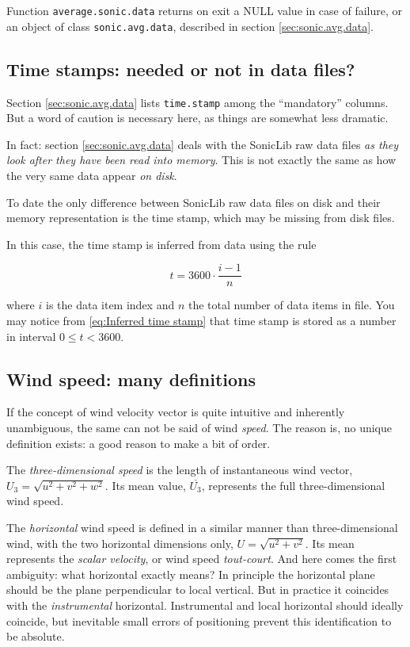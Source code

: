 \documentclass[a4paper,10pt]{book}
\begin{document}
Function \verb|average.sonic.data| returns on exit a NULL value in case of failure, or an object of class \verb|sonic.avg.data|, described in section \ref{sec:sonic.avg.data}.

\subsection{Time stamps: needed or not in data files?}

Section \ref{sec:sonic.avg.data} lists \verb|time.stamp| among the ``mandatory'' columns. But a word of caution is necessary here, as things are somewhat less dramatic.

In fact: section \ref{sec:sonic.avg.data} deals with the SonicLib raw data files \emph{as they look after they have been read into memory}. This is not exactly the same as how the very same data appear \emph{on disk}.

To date the only difference between SonicLib raw data files on disk and their memory representation is the time stamp, which may be missing from disk files.

In this case, the time stamp is inferred from data using the rule

\begin{equation}\label{eq:Inferred time stamp}
 t = 3600 \cdot \frac{i-1}{n}
\end{equation}

\noindent where $i$ is the data item index and $n$ the total number of data items in file. You may notice from \ref{eq:Inferred time stamp} that time stamp is stored as a number in interval $0 \le t < 3600$.


\subsection{Wind speed: many definitions}

If the concept of wind velocity vector is quite intuitive and inherently unambiguous, the same can not be said of wind \emph{speed}. The reason is, no unique definition exists: a good reason to make a bit of order.

The \emph{three-dimensional speed} is the length of instantaneous wind vector, $U_{3} =\sqrt{u^{2} + v^{2} + w^{2}}$. Its mean value, $\overline{U_{3}}$, represents the full three-dimensional wind speed.

The \emph{horizontal} wind speed is defined in a similar manner than three-dimensional wind, with the two horizontal dimensions only, $U = \sqrt{u^{2} + v^{2}}$. Its mean represents the \emph{scalar velocity}, or wind speed \emph{tout-court}. And here comes the first ambiguity: what horizontal exactly means? In principle the horizontal plane should be the plane perpendicular to local vertical. But in practice it coincides with the \emph{instrumental} horizontal. Instrumental and local horizontal should ideally coincide, but inevitable small errors of positioning prevent this identification to be absolute.
\end{document}
